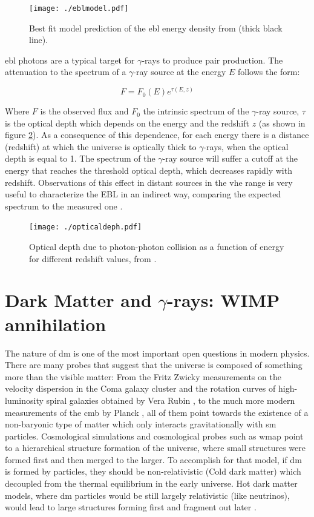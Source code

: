 \documentclass[main.tex]{subfiles}
\begin{document}
\begin{figure}
\centering
 \texttt{[image: ./eblmodel.pdf]}
  \caption{Best fit model prediction of the \gls{ebl} energy density from \cite{FranceschiniEBL} (thick black line).}
    \label{fig:eblmodel}
\end{figure}

\gls{ebl} photons are a typical target for $\gamma$-rays to produce pair production. The attenuation to the spectrum of a $\gamma$-ray source at the energy $E$ follows the form:

\begin{equation}
    F = F_{0}(E) e^{\tau(E,z)} 
\end{equation}

Where $F$ is the observed flux and $F_{0}$ the intrinsic spectrum of the $\gamma$-ray source, $\tau$ is the optical depth which depends on the energy and the redshift $z$ (as shown in figure \ref{fig:depth}). As a consequence of this dependence, for each energy there is a distance (redshift) at which the universe is optically thick to $\gamma$-rays, when the optical depth is equal to 1. The spectrum of the $\gamma$-ray source will suffer a cutoff at the energy that reaches the threshold optical depth, which decreases rapidly with redshift. Observations of this effect in distant sources in the \gls{vhe} range is very useful to characterize the EBL in an indirect way, comparing the expected spectrum to the measured one \cite{2017ICRCEBL}.

\begin{figure}
\centering
 \texttt{[image: ./opticaldeph.pdf]}
  \caption{Optical depth due to photon-photon collision as a function of energy for different redshift values, from \cite{FranceschiniEBL}.}
    \label{fig:depth}
\end{figure}


\section{Dark Matter and $\gamma$-rays: WIMP annihilation} \label{sec:DM}

The nature of \gls{dm} is one of the most important open questions in modern physics. There are many probes that suggest that the universe is composed of something more than the visible matter: From the Fritz Zwicky measurements on the velocity dispersion in the Coma galaxy cluster \cite{Zwicky} and the rotation curves of high-luminosity spiral galaxies obtained by Vera Rubin \cite{1978Rubin}, to the much more modern measurements of the \gls{cmb} by Planck \cite{2014Planck}, all of them point towards the existence of a non-baryonic type of matter which only interacts gravitationally with \gls{sm} particles. Cosmological simulations and cosmological probes such as \gls{wmap} point to a hierarchical structure formation of the universe, where small structures were formed first and then merged to the larger. To accomplish for that model, if \gls{dm} is formed by particles, they should be non-relativistic (Cold dark matter) which decoupled from the thermal equilibrium in the early universe. Hot dark matter models, where \gls{dm} particles would be still largely relativistic (like neutrinos), would lead to large structures forming first and fragment out later \cite{2003Olive}. 
\end{document}
